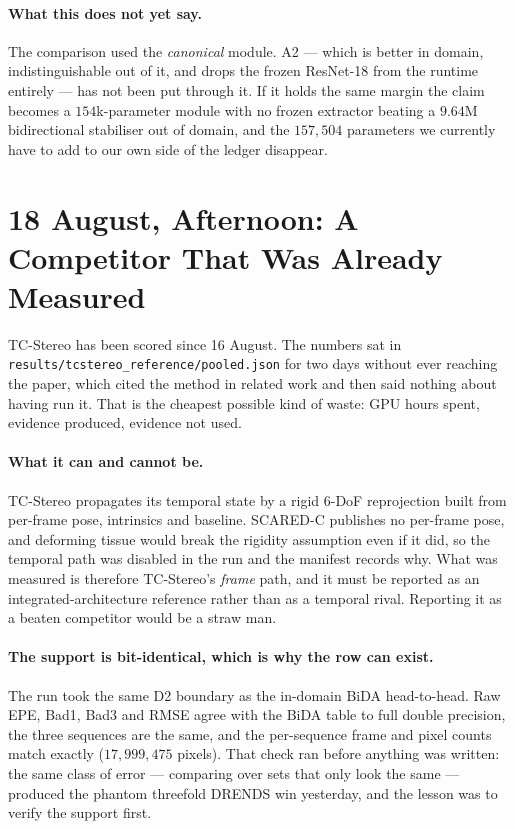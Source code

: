 \documentclass[11pt,a4paper]{article}
\begin{document}
\paragraph{What this does not yet say.} The comparison used the
\emph{canonical} module. A2 --- which is better in domain, indistinguishable
out of it, and drops the frozen ResNet-18 from the runtime entirely --- has
not been put through it. If it holds the same margin the claim becomes a
$154$k-parameter module with no frozen extractor beating a $9.64$M
bidirectional stabiliser out of domain, and the $157{,}504$ parameters we
currently have to add to our own side of the ledger disappear.



\section*{18 August, Afternoon: A Competitor That Was Already Measured}

TC-Stereo has been scored since 16 August. The numbers sat in
\texttt{results/tcstereo\_reference/pooled.json} for two days without ever
reaching the paper, which cited the method in related work and then said
nothing about having run it. That is the cheapest possible kind of waste:
GPU hours spent, evidence produced, evidence not used.

\paragraph{What it can and cannot be.} TC-Stereo propagates its temporal
state by a rigid $6$-DoF reprojection built from per-frame pose,
intrinsics and baseline. SCARED-C publishes no per-frame pose, and
deforming tissue would break the rigidity assumption even if it did, so the
temporal path was disabled in the run and the manifest records why. What
was measured is therefore TC-Stereo's \emph{frame} path, and it must be
reported as an integrated-architecture reference rather than as a temporal
rival. Reporting it as a beaten competitor would be a straw man.

\paragraph{The support is bit-identical, which is why the row can exist.}
The run took the same D2 boundary as the in-domain BiDA head-to-head. Raw
EPE, Bad1, Bad3 and RMSE agree with the BiDA table to full double
precision, the three sequences are the same, and the per-sequence frame and
pixel counts match exactly ($17{,}999{,}475$ pixels). That check ran before
anything was written: the same class of error --- comparing over
sets that only look the same --- produced the phantom threefold DRENDS win
yesterday, and the lesson was to verify the support first.
\end{document}
